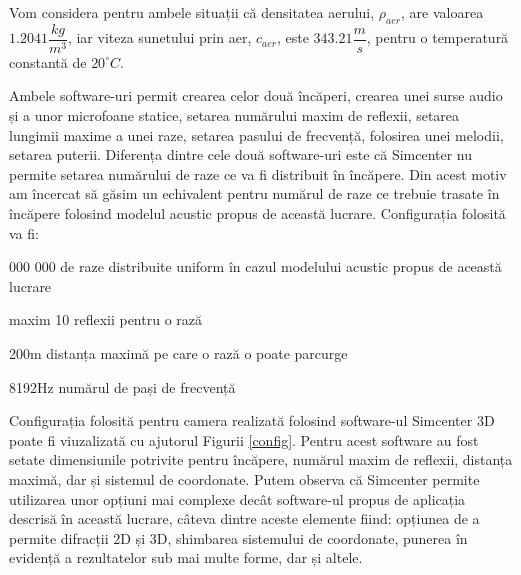	
	Vom considera pentru ambele situații c\u{a} densitatea aerului, $\rho_{aer}$, are valoarea $1.2041\dfrac{kg}{m^3}$, iar viteza sunetului prin aer, $c_{aer}$, este $343.21\dfrac{m}{s}$, pentru o temperatur\u{a} constant\u{a} de $20^{\circ}C$.

	Ambele software-uri permit crearea celor două încăperi, crearea unei surse audio și a unor microfoane statice, setarea numărului maxim de reflexii, setarea lungimii maxime a unei raze, setarea pasului de frecvență, folosirea unei melodii, setarea puterii. Diferența dintre cele două software-uri este că Simcenter nu permite setarea numărului de raze ce va fi distribuit în încăpere. Din acest motiv am încercat să găsim un echivalent pentru numărul de raze ce trebuie trasate în încăpere folosind modelul acustic propus de această lucrare. Configurația folosită va fi:
	
	\begin{itemize}
		 000 000 de raze distribuite uniform în cazul modelului acustic propus de această lucrare
		
		\utb maxim 10 reflexii pentru o rază
		
		\utb 200m distanța maximă pe care o rază o poate parcurge
		
		\utb 8192Hz numărul de pași de frecvență
	\end{itemize}	

	Configurația folosită pentru camera realizată folosind software-ul Simcenter 3D poate fi viuzalizată cu ajutorul Figurii \ref{config}. Pentru acest software au fost setate dimensiunile potrivite pentru încăpere, numărul maxim de reflexii, distanța maximă, dar și sistemul de coordonate. Putem observa că Simcenter permite utilizarea unor opțiuni mai complexe decât software-ul propus de aplicația descrisă în această lucrare, câteva dintre aceste elemente fiind: opțiunea de a permite difracții 2D și 3D, shimbarea sistemului de coordonate, punerea în evidență a rezultatelor sub mai multe forme, dar și altele.
	
